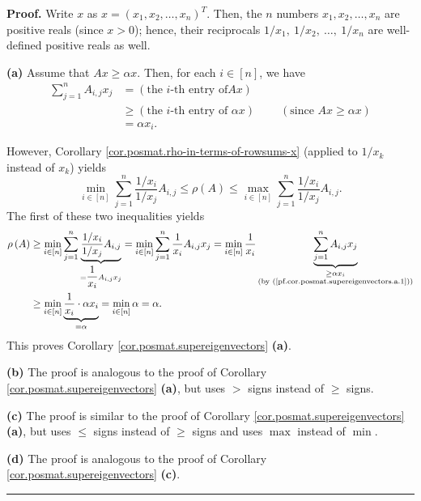\documentclass[numbers=enddot,12pt,final,onecolumn,notitlepage]{scrartcl}%
\numberwithin{exer}{subsection}
\theoremstyle{definition}
\newenvironment{proof}[1][Proof]{\noindent\textbf{#1.} }{\ \rule{0.5em}{0.5em}}
\let\sumnonlimits\sum
\renewcommand{\sum}{\sumnonlimits\limits}
\begin{document}
\begin{proof}
Write $x$ as $x=\left(  x_{1},x_{2},\ldots,x_{n}\right)  ^{T}$. Then, the $n$
numbers $x_{1},x_{2},\ldots,x_{n}$ are positive reals (since $x>0$); hence,
their reciprocals $1/x_{1},\ 1/x_{2},\ \ldots,\ 1/x_{n}$ are well-defined
positive reals as well. \medskip

\textbf{(a)} Assume that $Ax\geq\alpha x$. Then, for each $i\in\left[
n\right]  $, we have%
\begin{align}
\sum_{j=1}^{n}A_{i,j}x_{j}  &  =\left(  \text{the }i\text{-th entry of
}Ax\right) \nonumber\\
&  \geq\left(  \text{the }i\text{-th entry of }\alpha x\right)
\ \ \ \ \ \ \ \ \ \ \left(  \text{since }Ax\geq\alpha x\right) \nonumber\\
&  =\alpha x_{i}. \label{pf.cor.posmat.supereigenvectors.a.1}%
\end{align}


However, Corollary \ref{cor.posmat.rho-in-terms-of-rowsums-x} (applied to
$1/x_{k}$ instead of $x_{k}$) yields%
\[
\min\limits_{i\in\left[  n\right]  }\sum_{j=1}^{n}\dfrac{1/x_{i}}{1/x_{j}%
}A_{i,j}\leq\rho\left(  A\right)  \leq\max\limits_{i\in\left[  n\right]  }%
\sum_{j=1}^{n}\dfrac{1/x_{i}}{1/x_{j}}A_{i,j}.
\]
The first of these two inequalities yields%
\begin{align*}
\rho\left(  A\right)   &  \geq\min\limits_{i\in\left[  n\right]  }\sum
_{j=1}^{n}\underbrace{\dfrac{1/x_{i}}{1/x_{j}}A_{i,j}}_{=\dfrac{1}{x_{i}%
}A_{i,j}x_{j}}=\min\limits_{i\in\left[  n\right]  }\sum_{j=1}^{n}\dfrac
{1}{x_{i}}A_{i,j}x_{j}=\min\limits_{i\in\left[  n\right]  }\dfrac{1}{x_{i}%
}\underbrace{\sum_{j=1}^{n}A_{i,j}x_{j}}_{\substack{\geq\alpha x_{i}%
\\\text{(by (\ref{pf.cor.posmat.supereigenvectors.a.1}))}}}\\
&  \geq\min\limits_{i\in\left[  n\right]  }\underbrace{\dfrac{1}{x_{i}}%
\cdot\alpha x_{i}}_{=\alpha}=\min\limits_{i\in\left[  n\right]  }\alpha
=\alpha.
\end{align*}
This proves Corollary \ref{cor.posmat.supereigenvectors} \textbf{(a)}.
\medskip

\textbf{(b)} The proof is analogous to the proof of Corollary
\ref{cor.posmat.supereigenvectors} \textbf{(a)}, but uses $>$ signs instead of
$\geq$ signs. \medskip

\textbf{(c)} The proof is similar to the proof of Corollary
\ref{cor.posmat.supereigenvectors} \textbf{(a)}, but uses $\leq$ signs instead
of $\geq$ signs and uses $\max$ instead of $\min$. \medskip

\textbf{(d)} The proof is analogous to the proof of Corollary
\ref{cor.posmat.supereigenvectors} \textbf{(c)}.
\end{proof}
\end{document}
